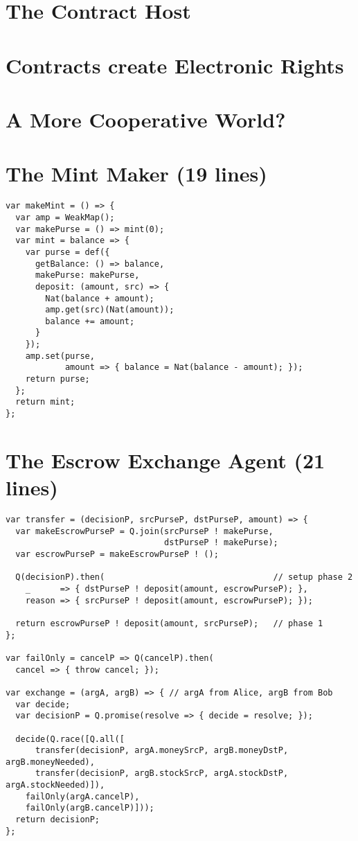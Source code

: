 \documentclass{llncs}
\begin{document}
\section{The Contract Host}
\section{Contracts create Electronic Rights}
\section{A More Cooperative World?}


% 



\appendix

\section{The Mint Maker (19 lines)}

\begin{verbatim}
var makeMint = () => {
  var amp = WeakMap();
  var makePurse = () => mint(0);
  var mint = balance => {
    var purse = def({
      getBalance: () => balance,
      makePurse: makePurse,
      deposit: (amount, src) => {
        Nat(balance + amount);
        amp.get(src)(Nat(amount)); 
        balance += amount; 
      } 
    });
    amp.set(purse, 
            amount => { balance = Nat(balance - amount); });
    return purse;
  };
  return mint;
};
\end{verbatim}

\section{The Escrow Exchange Agent (21 lines)}

\begin{verbatim}
var transfer = (decisionP, srcPurseP, dstPurseP, amount) => {
  var makeEscrowPurseP = Q.join(srcPurseP ! makePurse, 
                                dstPurseP ! makePurse);
  var escrowPurseP = makeEscrowPurseP ! ();

  Q(decisionP).then(                                  // setup phase 2
    _      => { dstPurseP ! deposit(amount, escrowPurseP); },
    reason => { srcPurseP ! deposit(amount, escrowPurseP); });

  return escrowPurseP ! deposit(amount, srcPurseP);   // phase 1
};

var failOnly = cancelP => Q(cancelP).then(
  cancel => { throw cancel; });

var exchange = (argA, argB) => { // argA from Alice, argB from Bob
  var decide;
  var decisionP = Q.promise(resolve => { decide = resolve; });

  decide(Q.race([Q.all([
      transfer(decisionP, argA.moneySrcP, argB.moneyDstP, argB.moneyNeeded),
      transfer(decisionP, argB.stockSrcP, argA.stockDstP, argA.stockNeeded)]),
    failOnly(argA.cancelP), 
    failOnly(argB.cancelP)]));
  return decisionP;
};
\end{verbatim}
\end{document}
